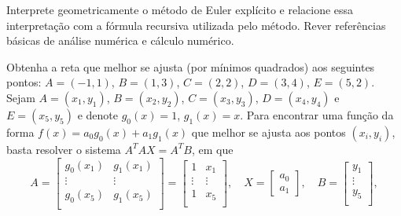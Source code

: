 \documentclass[12pt,a4paper]{article}
\begin{document}
\begin{ExerciseList}
\Exercise[title={1,0}] Interprete geometricamente o método de Euler explícito e relacione essa interpretação com a fórmula recursiva utilizada pelo método.
\Answer Rever referências básicas de análise numérica e cálculo numérico.

\Exercise[title={3,0}] Obtenha a reta que melhor se ajusta (por mínimos quadrados) aos seguintes pontos:
$A = (-1, 1)$,
$B = (1, 3)$,
$C = (2, 2)$,
$D = (3, 4)$,
$E = (5, 2)$.
\Answer Sejam $A = (x_1,y_1)$, $B = (x_2,y_2)$, $C = (x_3,y_3)$, $D = (x_4,y_4)$ e $E = (x_5,y_5)$ e denote $g_0(x) = 1$, $g_1(x) = x$. Para encontrar uma função da forma $f(x) = a_0 g_0(x) + a_1 g_1(x)$ que melhor se ajusta aos pontos $(x_i, y_i)$, basta resolver o sistema $A^T A X = A^T B$, em que
\[
A
= \begin{bmatrix}
g_0(x_1) & g_1(x_1) \\
\vdots & \vdots\\
g_0(x_5) & g_1(x_5) \\
\end{bmatrix}
= \begin{bmatrix}
1 & x_1 \\
\vdots & \vdots\\
1 & x_5 \\
\end{bmatrix},
\quad
X =
\begin{bmatrix}
a_0\\a_1
\end{bmatrix},
\quad
B = \begin{bmatrix}
y_1 \\
\vdots \\
y_5 \\
\end{bmatrix},
\]
\end{ExerciseList}
\end{document}
